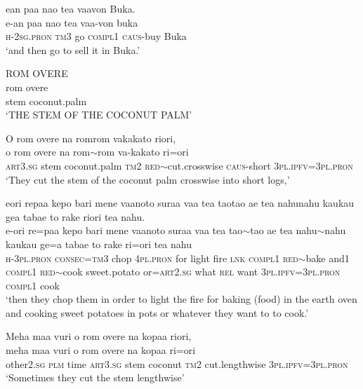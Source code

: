 \ea\label{ex:text01-177}
ean paa nao tea vaavon Buka.\\
\gll e-an	paa	nao	tea	vaa-von	buka\\
     \textsc{h}-2\textsc{sg}.\textsc{pron}	\textsc{tm}3	go	\textsc{compl}1	\textsc{caus}-buy	Buka\\
\glt `and then go to sell it in Buka.'
\z

\ea\label{ex:text01-178}
ROM OVERE\\
\gll rom	overe\\
     stem	coconut.palm\\
\glt `THE STEM OF THE COCONUT PALM'
\z

\ea\label{ex:text01-179}
O rom overe na romrom vakakato riori,\\
\gll o	rom	overe	na	rom{$\sim$}rom	va-kakato	ri=ori\\
     \textsc{art}3.\textsc{sg}	stem	coconut.palm	\textsc{tm}2	\textsc{red}{$\sim$}cut.crosswise	\textsc{caus}-short	3\textsc{pl}.\textsc{ipfv}=3\textsc{pl}.\textsc{pron}\\
\glt `They cut the stem of the coconut palm crosswise into short logs,'
\z

\ea\label{ex:text01-180}
eori repaa kepo bari mene vaanoto suraa vaa tea taotao ae tea nahunahu kaukau gea tabae to rake riori tea nahu.\\
\gll e-ori	re=paa	kepo	bari	mene	vaanoto	suraa	vaa	tea	tao{$\sim$}tao	ae	tea	nahu{$\sim$}nahu	kaukau	ge=a	tabae	to	rake	ri=ori	tea	nahu\\
     \textsc{h}-3\textsc{pl}.\textsc{pron}	\textsc{consec}=\textsc{tm}3	chop	4\textsc{pl}.\textsc{pron}	for	light	fire	\textsc{lnk}	\textsc{compl}1	\textsc{red}{$\sim$}bake	and1	\textsc{compl}1	\textsc{red}{$\sim$}cook	sweet.potato	or=\textsc{art}2.\textsc{sg}	what	\textsc{rel}	want	3\textsc{pl}.\textsc{ipfv}=3\textsc{pl}.\textsc{pron}	\textsc{compl}1	cook\\
\glt `then they chop them in order to light the fire for baking (food) in the earth oven and cooking sweet potatoes in pots or whatever they want to to cook.'
\z

\ea\label{ex:text01-181}
Meha maa vuri o rom overe na kopaa riori,\\
\gll meha	maa	vuri	o	rom	overe	na	kopaa	ri=ori\\
     other2.\textsc{sg}	\textsc{plm}	time	\textsc{art}3.\textsc{sg}	stem	coconut	\textsc{tm}2	cut.lengthwise	3\textsc{pl}.\textsc{ipfv}=3\textsc{pl}.\textsc{pron}\\
\glt `Sometimes they cut the stem lengthwise'
\z


